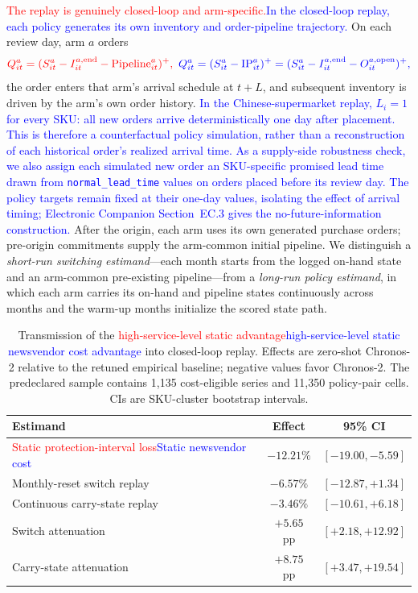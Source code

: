 \documentclass[msom,dblanonrev]{informs4}
\newcommand{\add}[1]{\textcolor{blue}{#1}}
\newcommand{\reduce}[1]{\textcolor{red}{#1}\hspace{0.5em}}
\begin{document}
\reduce{The replay is genuinely closed-loop and arm-specific.}\add{In the closed-loop replay, each policy generates its own inventory and order-pipeline trajectory.}
On each review day, arm $a$ orders
\[
\reduce{Q^a_{it}=(S^a_{it}-I^{a,\mathrm{end}}_{it}-\mathrm{Pipeline}^a_{it})^+,}
\add{Q^a_{it}=(S^a_{it}-\mathrm{IP}^a_{it})^+=(S^a_{it}-I^{a,\mathrm{end}}_{it}-O^{a,\mathrm{open}}_{it})^+,}
\]
the order enters that arm's arrival schedule at $t+L$, and subsequent inventory is driven by the arm's own order history.
\add{In the Chinese-supermarket replay, $L_i=1$ for every SKU: all new orders arrive deterministically one day after placement. This is therefore a counterfactual policy simulation, rather than a reconstruction of each historical order's realized arrival time.}
\add{As a supply-side robustness check, we also assign each simulated new order an SKU-specific promised lead time drawn from \texttt{normal\_lead\_time} values on orders placed before its review day. The policy targets remain fixed at their one-day values, isolating the effect of arrival timing; Electronic Companion Section~EC.3 gives the no-future-information construction.}
After the origin, each arm uses its own generated purchase orders; pre-origin commitments supply the arm-common initial pipeline.
We distinguish a \emph{short-run switching estimand}---each month starts from the logged on-hand state and an arm-common pre-existing pipeline---from a \emph{long-run policy estimand}, in which each arm carries its on-hand and pipeline states continuously across months and the warm-up months initialize the scored state path.

\begin{table}[ht]
\caption{Transmission of the \reduce{high-service-level static advantage}\add{high-service-level static newsvendor cost advantage} into closed-loop replay. Effects are zero-shot Chronos-2 relative to the retuned empirical baseline; negative values favor Chronos-2. The predeclared sample contains 1{,}135 cost-eligible series and 11{,}350 policy-pair cells. CIs are SKU-cluster bootstrap intervals.}\label{tab:transmission}
\centering\small
\begin{tabular}{lcc}
\toprule
\textbf{Estimand} & \textbf{Effect} & \textbf{95\% CI} \\
\midrule
\reduce{Static protection-interval loss}\add{Static newsvendor cost} & $-12.21\%$ & $[-19.00,-5.59]$ \\
Monthly-reset switch replay & $-6.57\%$ & $[-12.87,+1.34]$ \\
Continuous carry-state replay & $-3.46\%$ & $[-10.61,+6.18]$ \\
\midrule
Switch attenuation & $+5.65$ pp & $[+2.18,+12.92]$ \\
Carry-state attenuation & $+8.75$ pp & $[+3.47,+19.54]$ \\
\bottomrule
\end{tabular}
\end{table}
\end{document}

